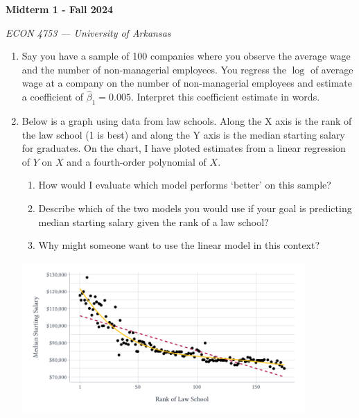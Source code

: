 \documentclass[12pt]{article}
\begin{document}
\begin{center}
  {\Huge\bf Midterm 1 - Fall 2024}
  
  \smallskip
  {\large\it ECON 4753 — University of Arkansas}
\end{center}

\vspace{5mm}
\begin{enumerate}
  \item Say you have a sample of 100 companies where you observe the average wage and the number of non-managerial employees. You regress the $\log$ of average wage at a company on the number of non-managerial employees and estimate a coefficient of $\hat{\beta}_1 = 0.005$. Interpret this coefficient estimate in words.
  




  \vspace{5mm}
  \item Below is a graph using data from law schools. Along the X axis is the rank of the law school (1 is best) and along the Y axis is the median starting salary for graduates. On the chart, I have ploted estimates from a linear regression of $Y$ on $X$ and a fourth-order polynomial of $X$.
  \begin{enumerate}
    \item How would I evaluate which model performs `better' on this sample?
    
    \item Describe which of the two models you would use if your goal is predicting median starting salary given the rank of a law school? 
    
    \item Why might someone want to use the linear model in this context?
  \end{enumerate}

  \begin{center}
    \includegraphics[width = 0.85\textwidth]{figures/plot_law_school_rank_and_salary.pdf}
  \end{center}






\end{enumerate}
\end{document}
